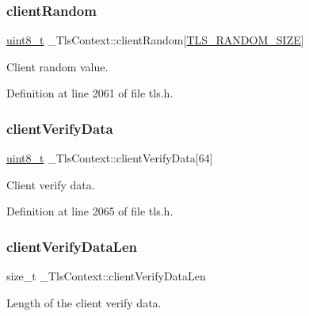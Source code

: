 \subsubsection{\texorpdfstring{client\+Random}{clientRandom}}
{\footnotesize\ttfamily \hyperlink{stdint_8h_aba7bc1797add20fe3efdf37ced1182c5}{uint8\+\_\+t} \+\_\+\+Tls\+Context\+::client\+Random\mbox{[}\hyperlink{tls_8h_aafeca350828039567f4495388ca1fa52}{T\+L\+S\+\_\+\+R\+A\+N\+D\+O\+M\+\_\+\+S\+I\+ZE}\mbox{]}}



Client random value. 



Definition at line 2061 of file tls.\+h.

\mbox{\label{struct__TlsContext_a35d51a09aa82c6b17d560f6b45fef6a2}} 
\subsubsection{\texorpdfstring{client\+Verify\+Data}{clientVerifyData}}
{\footnotesize\ttfamily \hyperlink{stdint_8h_aba7bc1797add20fe3efdf37ced1182c5}{uint8\+\_\+t} \+\_\+\+Tls\+Context\+::client\+Verify\+Data\mbox{[}64\mbox{]}}



Client verify data. 



Definition at line 2065 of file tls.\+h.

\mbox{\label{struct__TlsContext_a008d5effdf62dbbc147c872022c9fe72}} 
\subsubsection{\texorpdfstring{client\+Verify\+Data\+Len}{clientVerifyDataLen}}
{\footnotesize\ttfamily size\+\_\+t \+\_\+\+Tls\+Context\+::client\+Verify\+Data\+Len}



Length of the client verify data. 



